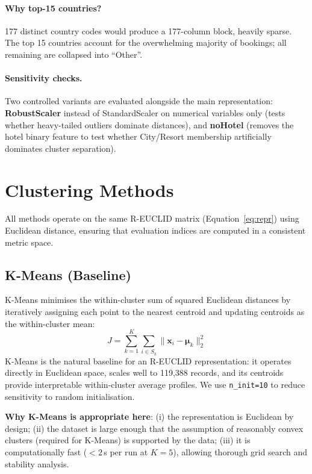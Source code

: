 \documentclass[12pt,a4paper]{article}
\begin{document}
\paragraph{Why top-15 countries?}
177 distinct country codes would produce a 177-column block, heavily
sparse. The top 15 countries account for the overwhelming majority of
bookings; all remaining are collapsed into ``Other''.

\paragraph{Sensitivity checks.}
Two controlled variants are evaluated alongside the main representation:
\textbf{RobustScaler} instead of StandardScaler on numerical variables only
(tests whether heavy-tailed outliers dominate distances), and
\textbf{noHotel} (removes the hotel binary feature to test whether
City/Resort membership artificially dominates cluster separation).


\section{Clustering Methods}
\label{sec:methods}

All methods operate on the same R-EUCLID matrix (Equation~\ref{eq:repr})
using Euclidean distance, ensuring that evaluation indices are computed
in a consistent metric space.

\subsection{K-Means (Baseline)}
K-Means minimises the within-cluster sum of squared Euclidean distances
by iteratively assigning each point to the nearest centroid and updating
centroids as the within-cluster mean:
\begin{equation}
  J = \sum_{k=1}^K \sum_{i \in S_k} \|\mathbf{x}_i - \boldsymbol{\mu}_k\|_2^2
\end{equation}
K-Means is the natural baseline for an R-EUCLID representation: it
operates directly in Euclidean space, scales well to 119,388 records,
and its centroids provide interpretable within-cluster average profiles.
We use \texttt{n\_init=10} to reduce sensitivity to random initialisation.

\textbf{Why K-Means is appropriate here}: (i) the representation is
Euclidean by design; (ii) the dataset is large enough that the
assumption of reasonably convex clusters (required for K-Means) is
supported by the data; (iii) it is computationally fast ($< 2$\,s per
run at $K=5$), allowing thorough grid search and stability analysis.
\end{document}
